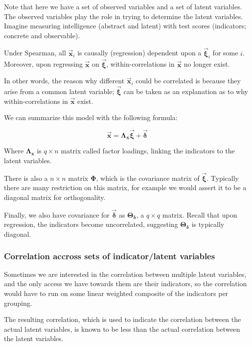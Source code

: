 \documentclass{article}
\begin{document}
\begin{multicols*}{2}
Note that here we have a set of observed variables and a set of latent variables. The observed variables play the role in trying to determine the latent variables. Imagine measuring intelligence (abstract and latent) with test scores (indicators; concrete and observable).

Under Spearman, all $\mathbf{\vec{x}}_i$ is causally (regression) dependent upon a $\mathbf{\vec{\xi}}_i$ for some $i$. Moreover, upon regressing $\mathbf{\vec{x}}$ on $\mathbf{\vec{\xi}}$, within-correlations in $\mathbf{\vec{x}}$ no longer exist.

In other words, the reason why different $\mathbf{\vec{x}}_i$ could be correlated is because they arise from a common latent variable; $\mathbf{\vec{\xi}}$ can be taken as an explanation as to why within-correlations in $\mathbf{\vec{x}}$ exist.

We can summarize this model with the following formula:

\[\mathbf{\vec{x}} = \mathbf{\Lambda_x}\mathbf{\vec{\xi}} + \mathbf{\vec{\delta}}\]

Where $\mathbf{\Lambda_x}$ is $q \times n$ matrix called factor loadings, linking the indicators to the latent variables.

There is also a $n \times n$ matrix $\mathbf{\Phi}$, which is the covariance matrix of $\mathbf{\vec{\xi}}$. Typically there are many restriction on this matrix, for example we would assert it to be a diagonal matrix for orthogonality.

Finally, we also have covariance for $\mathbf{\vec{\delta}}$ as $\mathbf{\Theta_\delta}$, a $q \times q$ matrix. Recall that upon regression, the indicators become uncorrelated, suggesting $\mathbf{\Theta_\delta}$ is typically diagonal.

\subsubsection{Correlation accross sets of indicator/latent variables}

Sometimes we are interested in the correlation between multiple latent variables, and the only access we have towards them are their indicators, so the correlation would have to run on some linear weighted composite of the indicators per grouping.

The resulting correlation, which is used to indicate the correlation between the actual latent variables, is known to be less than the actual correlation between the latent variables.


\end{multicols*}
\end{document}
